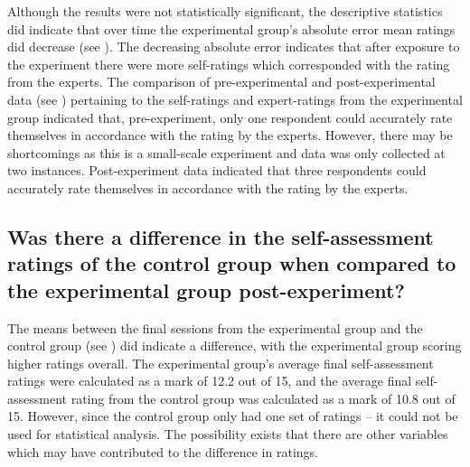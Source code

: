 \documentclass[output=paper]{langsci/langscibook}
\begin{document}
Although the results were not statistically significant, the descriptive statistics did indicate that over time the experimental group’s absolute error mean ratings did decrease (see ). The decreasing absolute error indicates that after exposure to the experiment there were more self-ratings which corresponded with the rating from the experts. The comparison of pre-experimental and post-experimental data (see ) pertaining to the self-ratings and expert-ratings from the experimental group indicated that, pre-experiment, only one respondent could accurately rate themselves in accordance with the rating by the experts. However, there may be shortcomings as this is a small-scale experiment and data was only collected at two instances. Post-experiment data indicated that three respondents could accurately rate themselves in accordance with the rating by the experts.

\subsection{Was there a difference in the self-assessment ratings of the control group when compared to the experimental group post-experiment?}

The means between the final sessions from the experimental group and the control group (see ) did indicate a difference, with the experimental group scoring higher ratings overall. The experimental group’s average final self-assess\-ment ratings were calculated as a mark of 12.2 out of 15, and the average final self-assessment rating from the control group was calculated as a mark of 10.8 out of 15. However, since the control group only had one set of ratings – it could not be used for statistical analysis. The possibility exists that there are other variables which may have contributed to the difference in ratings. 
\end{document}
